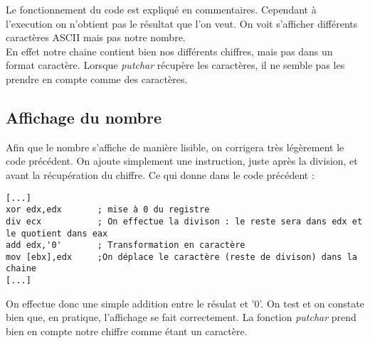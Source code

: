 Le fonctionnement du code est expliqué en commentaires. Cependant à l'execution on n'obtient pas le résultat que l'on veut. On voit s'afficher différents caractères ASCII mais pas notre nombre.\\
En effet notre chaine contient bien nos différents chiffres, mais pas dans un format caractère. Lorsque \textit{putchar} récupère les caractères, il ne semble pas les prendre en compte comme des caractères.

\subsection{Affichage du nombre}
Afin que le nombre s'affiche de manière lisible, on corrigera très légèrement le code précédent.
On ajoute simplement une instruction, juste après la division, et avant la récupération du chiffre. Ce qui donne dans le code précédent :

\begin{lstlisting}[language={[x86masm]Assembler}]
[...]
xor edx,edx       ; mise à 0 du registre
div ecx           ; On effectue la divison : le reste sera dans edx et le quotient dans eax
add edx,'0'       ; Transformation en caractère
mov [ebx],edx     ;On déplace le caractère (reste de divison) dans la chaine
[...]
\end{lstlisting}

On effectue donc une simple addition entre le résulat et '0'. On test et on constate bien que, en pratique, l'affichage se fait correctement. La fonction \textit{putchar} prend bien en compte notre chiffre comme étant un caractère.
